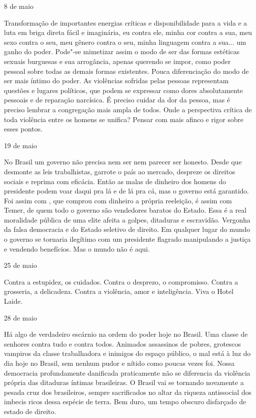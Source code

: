 \begin{flushright}
8 de maio
\end{flushright}

Transformação de importantes energias críticas e disponibilidade para a
vida e a luta em briga direta fácil e imaginária, eu contra ele, minha
cor contra a sua, meu sexo contra o seu, meu gênero contra o seu, minha
linguagem contra a sua... um ganho do poder. Pode"-se mimetizar assim o
modo de ser das formas estéticas sexuais burguesas e sua arrogância,
apenas querendo se impor, como poder pessoal sobre todas as demais
formas existentes. Pouca diferenciação do modo de ser mais íntimo do
poder. As violências sofridas pelas pessoas representam questões e
lugares políticos, que podem se expressar como dores absolutamente
pessoais e de reparação narcísica. É preciso cuidar da dor da pessoa,
mas é preciso lembrar a congregação mais ampla de todos. Onde a
perspectiva crítica de toda violência entre os homens se unifica? Pensar
com mais afinco e rigor sobre esses pontos.

\begin{flushright}
19 de maio
\end{flushright}

No Brasil um governo não precisa nem ser nem parecer ser honesto. Desde
que desmonte as leis trabalhistas, garrote o país ao mercado, despreze
os direitos sociais e reprima com eficácia. Então as malas de dinheiro
dos homens do presidente podem voar daqui pra lá e de lá pra cá, mas o
governo está garantido. Foi assim com , que comprou com dinheiro a
própria reeleição, é assim com Temer, de quem todo o governo são
vendedores baratos do Estado. Essa é a real moralidade pública de uma
elite afeita a golpes, ditaduras e escravidão. Vergonha da falsa
democracia e do Estado seletivo de direito. Em qualquer lugar do mundo o
governo se tornaria ilegítimo com um presidente flagrado manipulando a
justiça e vendendo benefícios. Mas o mundo não é aqui.

\begin{flushright}
25 de maio
\end{flushright}

Contra a estupidez, os cuidados. Contra o desprezo, o compromisso.
Contra a grosseria, a delicadeza. Contra a violência, amor e
inteligência. Viva o Hotel Laide.

\begin{flushright}
28 de maio
\end{flushright}

Há algo de verdadeiro escárnio na ordem do poder hoje no Brasil. Uma
classe de senhores contra tudo e contra todos. Animados assassinos de
pobres, grotescos vampiros da classe trabalhadora e inimigos do espaço
público, o mal está à luz do dia hoje no Brasil, sem nenhum pudor e
nítido como poucas vezes foi. Nossa democracia profundamente danificada
praticamente não se diferencia da violência própria das ditaduras
íntimas brasileiras. O Brasil vai se tornando novamente a pesada cruz
dos brasileiros, sempre sacrificados no altar da riqueza antissocial dos
imbecis ricos dessa espécie de terra. Bem duro, um tempo obscuro
disfarçado de estado de direito.

